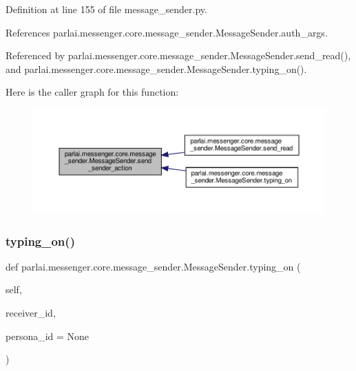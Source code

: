 Definition at line 155 of file message\+\_\+sender.\+py.



References parlai.\+messenger.\+core.\+message\+\_\+sender.\+Message\+Sender.\+auth\+\_\+args.



Referenced by parlai.\+messenger.\+core.\+message\+\_\+sender.\+Message\+Sender.\+send\+\_\+read(), and parlai.\+messenger.\+core.\+message\+\_\+sender.\+Message\+Sender.\+typing\+\_\+on().

Here is the caller graph for this function\+:
\nopagebreak
\begin{figure}[H]
\begin{center}
\leavevmode
\includegraphics[width=350pt]{classparlai_1_1messenger_1_1core_1_1message__sender_1_1MessageSender_a58c876784f5800234ed341a160bcf1b5_icgraph}
\end{center}
\end{figure}
\mbox{\label{classparlai_1_1messenger_1_1core_1_1message__sender_1_1MessageSender_af18c8b2ca27ba3ff86eed8175cea2656}} 
\subsubsection{\texorpdfstring{typing\+\_\+on()}{typing\_on()}}
{\footnotesize\ttfamily def parlai.\+messenger.\+core.\+message\+\_\+sender.\+Message\+Sender.\+typing\+\_\+on (\begin{DoxyParamCaption}\item[{}]{self,  }\item[{}]{receiver\+\_\+id,  }\item[{}]{persona\+\_\+id = {\ttfamily None} }\end{DoxyParamCaption})}



